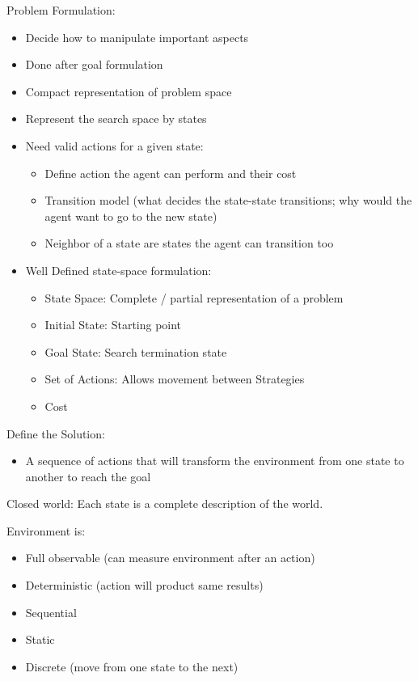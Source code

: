 \documentclass{article}
\begin{document}
    Problem Formulation:
    \begin{itemize}
        \item Decide how to manipulate important aspects
        \item Done after goal formulation
        \item Compact representation of problem space
        \item Represent the search space by states 
        \item Need valid actions for a given state:
        \begin{itemize}
            \item Define action the agent can perform and their cost
            \item Transition model (what decides the state-state transitions; why would the agent want to go to the new state)
            \item Neighbor of a state are states the agent can transition too
        \end{itemize}
        \item Well Defined state-space formulation:
        \begin{itemize}
            \item State Space: Complete / partial representation of a problem 
            \item Initial State: Starting point
            \item Goal State: Search termination state
            \item Set of Actions: Allows movement between Strategies
            \item Cost
        \end{itemize}
    \end{itemize}

    Define the Solution:
    \begin{itemize}
        \item A sequence of actions that will transform the environment from one state to another to reach the goal
    \end{itemize}

    Closed world: Each state is a complete description of the world.
    \setlength{\parskip}{6pt}
    
    Environment is:
    \begin{itemize}
        \item Full observable (can measure environment after an action)
        \item Deterministic (action will product same results)
        \item Sequential
        \item Static
        \item Discrete (move from one state to the next)
    \end{itemize}
\end{document}
